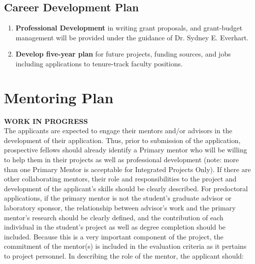 \documentclass[12pt,letterpaper]{article}
\begin{document}
\subsection{Career Development Plan}

\begin{enumerate}
  \item \textbf{Professional Development} in writing grant proposals, and grant-budget management will be provided under the guidance of Dr. Sydney E. Everhart.
  \item \textbf{Develop five-year plan} for future projects, funding sources, and jobs including applications to tenure-track faculty positions.  
\end{enumerate}



\section{Mentoring Plan}

\noindent \textbf{WORK IN PROGRESS}\\
\noindent The applicants are expected to engage their mentors and/or advisors in the
development of their application. Thus, prior to submission of the
application, prospective fellows should already identify a Primary mentor who
will be willing to help them in their projects as well as professional
development (note: more than one Primary Mentor is acceptable for Integrated
Projects Only). If there are other collaborating mentors, their role and
responsibilities to the project and development of the applicant's skills
should be clearly described. For predoctoral applications, if the primary
mentor is not the student's graduate advisor or laboratory sponsor, the
relationship between advisor's work and the primary mentor's research should
be clearly defined, and the contribution of each individual in the student's
project as well as degree completion should be included. Because this is a
very important component of the project, the commitment of the mentor(s) is
included in the evaluation criteria as it pertains to project personnel. In
describing the role of the mentor, the applicant should:
\end{document}
